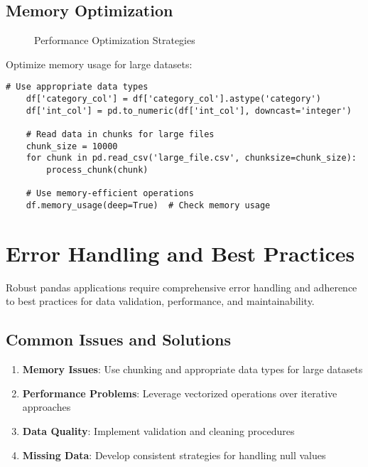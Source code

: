 \subsection{Memory Optimization}
\label{subsec:memory}

\begin{figure}[htbp]
	\centering
    
	\caption{Performance Optimization Strategies}
	\label{fig:performance_optimization}
\end{figure}

Optimize memory usage for large datasets:

\begin{lstlisting}[language=MyPython, caption={Memory Optimization}, label={lst:memory_optimization}]
	# Use appropriate data types
	df['category_col'] = df['category_col'].astype('category')
	df['int_col'] = pd.to_numeric(df['int_col'], downcast='integer')
	
	# Read data in chunks for large files
	chunk_size = 10000
	for chunk in pd.read_csv('large_file.csv', chunksize=chunk_size):
	    process_chunk(chunk)
	
	# Use memory-efficient operations
	df.memory_usage(deep=True)  # Check memory usage
\end{lstlisting}

\section{Error Handling and Best Practices}
\label{sec:best_practices}

Robust pandas applications require comprehensive error handling and adherence to best practices for data validation, performance, and maintainability.

\subsection{Common Issues and Solutions}
\label{subsec:common_issues}

\begin{enumerate}
	\item \textbf{Memory Issues}: Use chunking and appropriate data types for large datasets
	\item \textbf{Performance Problems}: Leverage vectorized operations over iterative approaches
	\item \textbf{Data Quality}: Implement validation and cleaning procedures
	\item \textbf{Missing Data}: Develop consistent strategies for handling null values
\end{enumerate}

